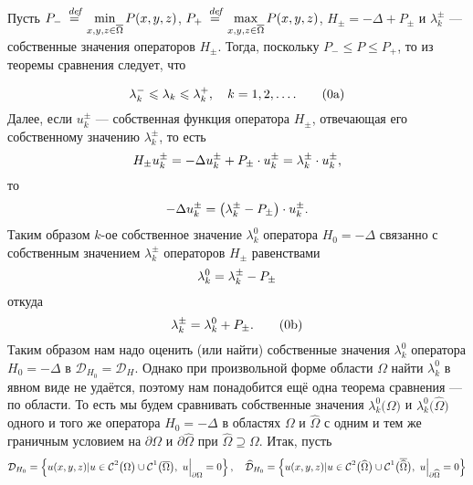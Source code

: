 \documentclass[12pt,a4paper,openany,fleqn]{book}
\newcommand {\defeq}{\stackrel{\hspace{0.09 cm}de\!f}{=}}
\newcommand {\eqdef}{\defeq}
\newcommand{\Cf}{\ensuremath{\mathcal{C}}}
\newcommand{\mc}[1]{\ensuremath{\mathcal{#1}}}
\newcommand{\Cfn}[2][]{\ensuremath{\Cf{\mathstrut}^{#2}_{#1}}}
\theoremstyle{definition}
\begin{document}
	Пусть $\displaystyle P_{-}\eqdef\min\limits_{x,y,z\in\overline{\Omega}}P(x,y,z)$, $\displaystyle P_{+}\eqdef\max\limits_{x,y,z\in\overline{\Omega}}P(x,y,z)$, $\displaystyle H_{\pm}=-\Delta+ P_{\pm}$  и $\lambda_k^{\pm}$ --- собственные значения операторов $H_{\pm}$. Тогда, поскольку $P_{-}\leqslant P\leqslant P_{+}$, то из теоремы сравнения следует, что%
	\addtocounter{equation}{1} 
	\begin{equation}\label{l10:eq:12a}
		\hfill\lambda_k^{-}\leqslant\lambda_k\leqslant\lambda_k^{+},\quad k=1,2,\ldots.\tag{\theequation a}\hfill
	\end{equation} 
	Далее, если $u_k^{\pm}$ --- собственная функция оператора $H_{\pm}$, отвечающая его собственному значению $\lambda_k^{\pm}$, то есть
	\begin{equation*}
		\hfill H_{\pm}u_k^{\pm}=-\Delta u_k^{\pm}+P_{\pm}\cdot u_k^{\pm}=\lambda_k^{\pm}\cdot u_k^{\pm},\hfill
	\end{equation*}
	то
	\begin{equation*}
		\hfill-\Delta u_k^{\pm}=\left(\lambda_k^{\pm}-P_{\pm}\right)\cdot u_k^{\pm}.\hfill
	\end{equation*}
	Таким образом $k$-ое собственное значение $\lambda_k^0$ оператора $H_0=-\Delta$ связанно с собственным значением $\lambda_k^{\pm}$ операторов $H_{\pm}$ равенствами
	\begin{equation*}
		\hfill\lambda_k^0=\lambda_k^{\pm}-P_{\pm}\hfill
	\end{equation*}
	откуда
	\begin{equation}\label{l10:eq:12b}
		\hfill\lambda_k^{\pm}=\lambda_k^0+P_{\pm}.\tag{\theequation b}\hfill
	\end{equation}
	Таким образом нам надо оценить (или найти) собственные значения $\lambda_k^0$ оператора $H_0=-\Delta$ в $\mc{D}_{H_0}=\mc{D}_H$. Однако при произвольной форме области $\Omega$ найти $\lambda_k^0$ в явном виде не удаётся, поэтому нам понадобится ещё одна теорема сравнения --- по области. То есть мы будем сравнивать собственные значения $\lambda_k^0\big(\Omega\big)$ и $\lambda_k^0\big(\widehat{\Omega}\big)$ одного и того же оператора $H_0=-\Delta$ в областях $\Omega$ и $\widehat{\Omega}$ с одним и тем же граничным условием на $\partial\Omega$ и $\partial\widehat{\Omega}$ при $\widehat{\Omega}\supseteq\Omega$. Итак, пусть
	\begin{equation*}
		\hfill\mc{D}_{H_0}=\left\{u(x,y,z)|u\in\Cfn{2}\big(\Omega\big)\cup\Cfn{1}\big(\overline{\Omega}\big),\ u\Big|_{\partial\Omega}=0\right\},\quad\widehat{\mc{D}}_{H_0}=\left\{u(x,y,z)|u\in\Cfn{2}\big(\widehat{\Omega}\big)\cup\Cfn{1}\big(\overline{\widehat{\Omega}}\big),\ u\Big|_{\partial\widehat{\Omega}}=0\right\}
	\end{equation*}  
\end{document}

